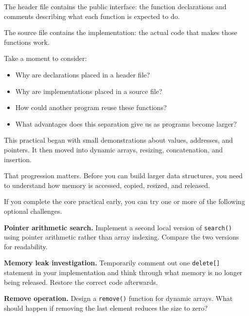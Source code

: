 \documentclass{csc2059practical}
\begin{document}
The header file contains the public interface: the function declarations and comments describing what each function is expected to do.

The source file contains the implementation: the actual code that makes those functions work.

Take a moment to consider:
\begin{itemize}
  \item Why are declarations placed in a header file?
  \item Why are implementations placed in a source file?
  \item How could another program reuse these functions?
  \item What advantages does this separation give us as programs become larger?
\end{itemize}

\begin{reflectionbox}
This practical began with small demonstrations about values, addresses, and pointers. It then moved into dynamic arrays, resizing, concatenation, and insertion.

That progression matters. Before you can build larger data structures, you need to understand how memory is accessed, copied, resized, and released.
\end{reflectionbox}


If you complete the core practical early, you can try one or more of the following optional challenges.

\begin{challengebox}
\textbf{Pointer arithmetic search.} Implement a second local version of \texttt{search()} using pointer arithmetic rather than array indexing. Compare the two versions for readability.
\end{challengebox}

\begin{challengebox}
\textbf{Memory leak investigation.} Temporarily comment out one \texttt{delete[]} statement in your implementation and think through what memory is no longer being released. Restore the correct code afterwards.
\end{challengebox}

\begin{challengebox}
\textbf{Remove operation.} Design a \texttt{remove()} function for dynamic arrays. What should happen if removing the last element reduces the size to zero?
\end{challengebox}
\end{document}
